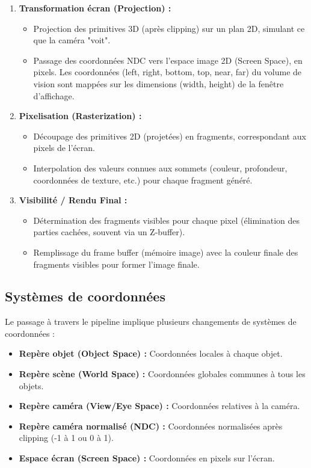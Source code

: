 \documentclass{article}
\begin{document}
\begin{enumerate}
\begin{itemize}
    \end{itemize}
    \item \textbf{Transformation écran (Projection) :}
    \begin{itemize}
        \item Projection des primitives 3D (après clipping) sur un plan 2D, simulant ce que la caméra "voit".
        \item Passage des coordonnées NDC vers l'espace image 2D (Screen Space), en pixels. Les coordonnées (left, right, bottom, top, near, far) du volume de vision sont mappées sur les dimensions (width, height) de la fenêtre d'affichage.
    \end{itemize}
    \item \textbf{Pixelisation (Rasterization) :}
    \begin{itemize}
        \item Découpage des primitives 2D (projetées) en fragments, correspondant aux pixels de l'écran.
        \item Interpolation des valeurs connues aux sommets (couleur, profondeur, coordonnées de texture, etc.) pour chaque fragment généré.
    \end{itemize}
    \item \textbf{Visibilité / Rendu Final :}
    \begin{itemize}
        \item Détermination des fragments visibles pour chaque pixel (élimination des parties cachées, souvent via un Z-buffer).
        \item Remplissage du frame buffer (mémoire image) avec la couleur finale des fragments visibles pour former l'image finale.
    \end{itemize}
\end{enumerate}
\subsection{Systèmes de coordonnées}
Le passage à travers le pipeline implique plusieurs changements de systèmes de coordonnées :
\begin{itemize}
    \item \textbf{Repère objet (Object Space) :} Coordonnées locales à chaque objet.
    \item \textbf{Repère scène (World Space) :} Coordonnées globales communes à tous les objets.
    \item \textbf{Repère caméra (View/Eye Space) :} Coordonnées relatives à la caméra.
    \item \textbf{Repère caméra normalisé (NDC) :} Coordonnées normalisées après clipping (-1 à 1 ou 0 à 1).
    \item \textbf{Espace écran (Screen Space) :} Coordonnées en pixels sur l'écran.
\end{itemize}
\end{document}
